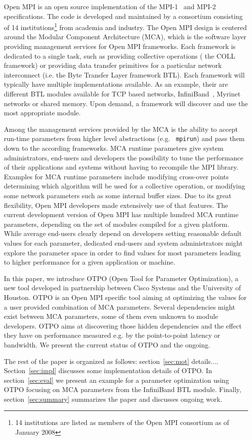 Open MPI\cite{gabriel:ompi} is an open source implementation of the
MPI-1~\cite{mpi1} and MPI-2~\cite{mpi2} specifications. The code is
developed and maintained by a consortium consisting of 14
institutions\footnote{14 institutions are listed as members of the
Open MPI consortium as of January 2008} from academia and
industry. The Open MPI design is centered around the Modular Component
Architecture (MCA), which is the software layer providing management
services for Open MPI frameworks. Each framework is dedicated to a
single task, such as providing collective operations ( the COLL
framework) or providing data transfer primitives for a particular
network interconnect (i.e. the Byte Transfer Layer framework
BTL). Each framework will typically have multiple implementations
available. As an example, their are different BTL modules available
for TCP based networks, InfiniBand~\cite{ib}, Myrinet networks or
shared memory. Upon demand, a framework will discover and use the most
appropriate module.

Among the management services provided by the MCA is the ability to
accept run-time parameters from higher level abstractions (e.g. {\tt
mpirun}) and pass them down to the according frameworks. MCA runtime
parameters give system administrators, end-users and developers the
possibility to tune the performance of their applications and systems
without having to recompile the MPI library. Examples for MCA runtime
parameters include modifying cross-over points determining which
algorithm will be used for a collective operation, or modifying some
network parameters such as some internal buffer sizes. Due to its
great flexibility, Open MPI developers made extensively use of that
features. The current development version of Open MPI has multiple
hundred MCA runtime parameters, depending on the set of modules
compiled for a given platform. While average end-users clearly depend
on developers setting reasonable default values for each parameter,
dedicated end-users and system administrators might explore the
parameter space in order to find values for most parameters leading to
higher performance for a given application or machine.

In this paper, we introduce OTPO (Open Tool for Parameter
Optimization), a new tool developed in partnership between Cisco
Systems and the University of Houston. OTPO is an Open MPI specific
tool aiming at optimizing the values for a user provided combination
of MCA parameters. Several dependencies might exist between MCA
parameters, some of them even unknown to module developers. OTPO aims
at discovering those hidden dependencies and the effect they have on
performance measured e.g. by the point-to-point latency or
bandwidth. We present the current status of OTPO and the ongoing.


The rest of the paper is organized as follows: section~\ref{sec:mot}
details.... Section~\ref{sec:impl} discusses some implementation
details of OTPO. In section~\ref{sec:eval} we present an example for a
parameter optimization using OTPO focusing on MCA parameters from the
InfiniBand BTL module. Finally, section~\ref{sec:summary} summarizes
the paper and discusses ongoing work.

